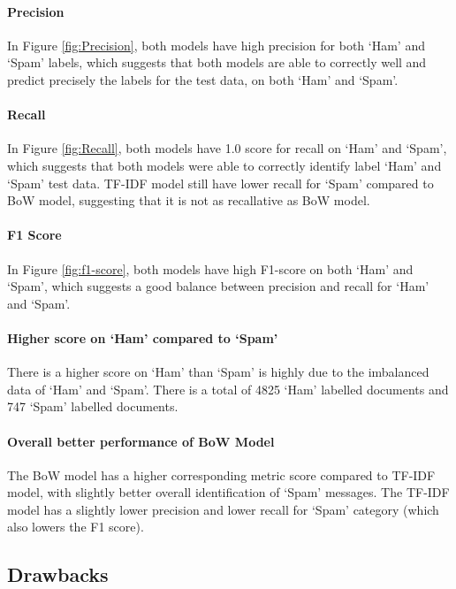 \paragraph{Precision}
In Figure \ref{fig:Precision}, both models have high precision for both `Ham' and `Spam' labels, which suggests that both models are able to correctly well and  predict precisely the labels for the test data, on both `Ham' and `Spam'.

\paragraph{Recall}
In Figure \ref{fig:Recall}, both models have 1.0 score for recall on `Ham' and `Spam', which suggests that both models were able to correctly identify label `Ham'  and `Spam' test data.
TF-IDF model still have lower recall for `Spam' compared to BoW model, suggesting that it is not as recallative as BoW model. 

\paragraph{F1 Score}
In Figure \ref{fig:f1-score}, both models have high F1-score on both `Ham' and `Spam', which suggests a good balance between precision and recall for `Ham' and `Spam'.

\paragraph{Higher score on `Ham' compared to `Spam'}
There is a higher score on `Ham' than `Spam' is highly due to the imbalanced data of `Ham' and `Spam'.
There is a total of 4825 `Ham' labelled documents and 747 `Spam' labelled documents.

\paragraph{Overall better performance of BoW Model}
The BoW model has a higher corresponding metric score compared to TF-IDF model, with slightly better overall identification of `Spam' messages.
The TF-IDF model has a slightly lower precision and lower recall for `Spam' category (which also lowers the F1 score).





\subsection{Drawbacks}

